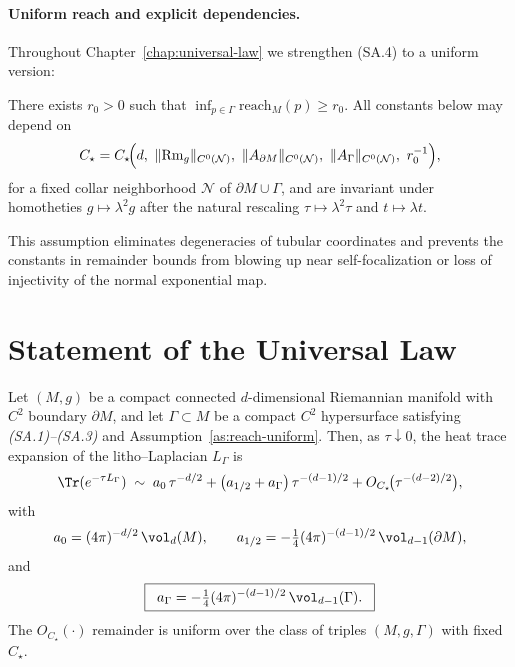 \paragraph{Uniform reach and explicit dependencies.}
Throughout Chapter~\ref{chap:universal-law} we strengthen (SA.4) to a uniform version:
\begin{assumption}\label{as:reach-uniform}
There exists $r_0>0$ such that $\inf_{p\in\Gamma}\mathrm{reach}_M(p)\ge r_0$.
All constants below may depend on
\[
C_\star=C_\star\!\Big(d,\ \|{\rm Rm}_g\|_{C^0(\mathcal N)},\ \|A_{\partial M}\|_{C^0(\mathcal N)},\ \|A_\Gamma\|_{C^0(\mathcal N)},\ r_0^{-1}\Big),
\]
for a fixed collar neighborhood $\mathcal N$ of $\partial M\cup\Gamma$, and are invariant under homotheties $g\mapsto \lambda^2 g$ after the natural rescaling $\tau\mapsto \lambda^2\tau$ and $t\mapsto \lambda t$.
\end{assumption}
This assumption eliminates degeneracies of tubular coordinates and prevents the constants in remainder bounds from blowing up near self-focalization or loss of injectivity of the normal exponential map.

\bigskip

\section{Statement of the Universal Law}
\label{sec:statement}

\begin{theorem}\label{thm:universal}
Let $(M,g)$ be a compact connected $d$-dimensional Riemannian manifold with $C^2$ boundary $\partial M$,
and let $\Gamma\subset M$ be a compact $C^2$ hypersurface satisfying \emph{(SA.1)--(SA.3)} and Assumption~\ref{as:reach-uniform}.
Then, as $\tau\downarrow 0$, the heat trace expansion of the litho--Laplacian $L_\Gamma$ is
\[
\Tr(e^{-\tau L_\Gamma}) \;\sim\;
a_0 \,\tau^{-d/2}
+ \big( a_{1/2} + a_\Gamma \big)\,\tau^{-(d-1)/2}
+ O_{C_\star}\!\big(\tau^{-(d-2)/2}\big),
\]
with
\[
a_0 = (4\pi)^{-d/2}\,\vol_d(M),\qquad
a_{1/2} = -\tfrac14(4\pi)^{-(d-1)/2}\,\vol_{d-1}(\partial M),
\]
and
\[
\boxed{\;\; a_\Gamma = -\tfrac14(4\pi)^{-(d-1)/2}\,\vol_{d-1}(\Gamma). \;\;}
\]
The $O_{C_\star}(\cdot)$ remainder is uniform over the class of triples $(M,g,\Gamma)$ with fixed $C_\star$.
\end{theorem}

